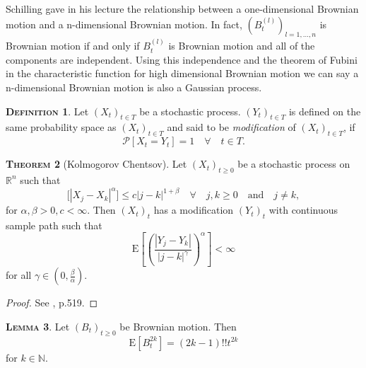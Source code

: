 \documentclass[a4paper, twoside, 11pt]{article}
\theoremstyle{definition}
\newtheorem{definition}{\scshape Definition}[section]
\newtheorem{theorem}[definition]{\scshape Theorem}
\newtheorem{lemma}[definition]{\scshape Lemma}
\begin{document}
Schilling gave in his lecture \cite{shilling} the relationship between a one-dimensional Brownian motion and a n-dimensional Brownian motion.
In fact, $(B_t^{(l)})_{l=1,\dots,n}$ is Brownian motion if and only if $B_t^{(l)}$ is Brownian motion and all of the components are independent. Using this independence and the theorem of Fubini in the characteristic function for high dimensional Brownian motion we can say a n-dimensional Brownian motion is also a Gaussian process.

\begin{definition}
  Let $(X_t)_{t\in T}$  be a stochastic process. $(Y_t)_{t\in T}$ is defined on the same probability space as $(X_t)_{t\in T}$ and said to be \emph{modification} of $(X_t)_{t\in T}$, if
  \begin{equation*}
	\mathcal{P}[X_t = Y_t] = 1 \hspace{1em} \forall \hspace{1em} t\in T.
  \end{equation*}
\end{definition}

\begin{theorem}[Kolmogorov Chentsov]
   Let $(X_t)_{t \ge 0}$ be a stochastic process on $\mathbb{R}^{n}$ such that
  \begin{equation*}
	\mathrm[|X_j - X_k|^\alpha] \le c |j - k|^{1+\beta} \hspace{1em}\forall \hspace{1em} j ,k \ge 0 \hspace{1em} \text{and} \hspace{1em} j\neq k,
  \end{equation*}
  for $\alpha, \beta > 0, c < \infty$. Then $(X_t)_t$ has a modification $(Y_t)_t$ with continuous sample path such that 
  \begin{equation*}
	\mathrm{E}[(\frac{|Y_j - Y_k|}{|j - k|^\gamma})^\alpha] < \infty
  \end{equation*}
  for all $\gamma \in (0, \frac{\beta}{\alpha})$.
  \label{sec:kolch}
\end{theorem}
\begin{proof}
  See \cite{loeve}, p.519.
\end{proof}

\begin{lemma}
   Let $(B_t)_{t\ge 0}$ be Brownian motion. Then
   \begin{equation*}
	 \mathrm{E}[B_t^{2k}] = (2k - 1)!! t^{2k}
   \end{equation*}
   for $k \in \mathbb{N}$.
   \label{sec:le1}
\end{lemma}
\end{document}
